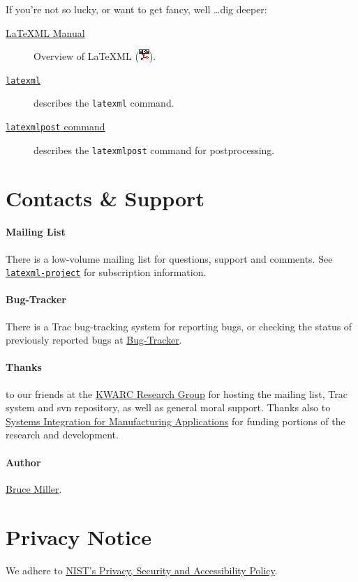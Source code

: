 \documentclass{article}
\newcommand{\PDFIcon}{\includegraphics{pdf}}
\begin{document}
If you're not so lucky, or want to get fancy, well \ldots dig deeper:
\begin{description}
\item[\href{manual/index.xhtml}{LaTeXML Manual}]
    Overview of LaTeXML (\href{manual.pdf}{\PDFIcon}).
\item[\href{manual/commands/latexml.xhtml}{\texttt{latexml}}]
    describes the \texttt{latexml} command.
\item[\href{manual/commands/latexmlpost.xhtml}{\texttt{latexmlpost} command}]
   describes the \texttt{latexmlpost} command for postprocessing.
\end{description}


\section{Contacts \& Support}\label{contact}

\paragraph{Mailing List}
There is a low-volume mailing list for questions, support and comments.
See \href{http://lists.jacobs-university.de/mailman/listinfo/project-latexml}{\texttt{latexml-project}} for subscription information.


\paragraph{Bug-Tracker}
  There is a Trac bug-tracking system for reporting bugs, or checking the
  status of previously reported bugs at
 \href{https://trac.mathweb.org/LaTeXML/}{Bug-Tracker}.


\paragraph{Thanks} to our friends at
the \href{http://kwarc.info}{KWARC Research Group}
for hosting the mailing list, Trac system and svn repository,
as well as general moral support.
Thanks also to \href{http://nist.gov/sima}{Systems Integration for Manufacturing Applications}
for funding portions of the research and development.

\paragraph{Author} \href{mailto:bruce.miller@nist.gov}{Bruce Miller}.
\section{Privacy Notice}\label{privacy}
We adhere to \href{http://www.nist.gov/public_affairs/privacy.htm}{NIST's Privacy, Security and Accessibility Policy}.
\end{document}

